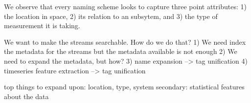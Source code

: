 We observe that every naming scheme looks to capture three point attributes: 
1) the location in space, 2) its relation to an subsytem, and 3) the type of 
measurement it is taking.  

We want to make the streams searchable.  How do we do that?
1) We need index the metadata for the streams but the metadata available is not enough
2) We need to expand the metadata, but how?
3) name expansion --> tag unification
4) timeseries feature extraction --> tag unification

top things to expand upon:  location, type, system
secondary: statistical features about the data
 
